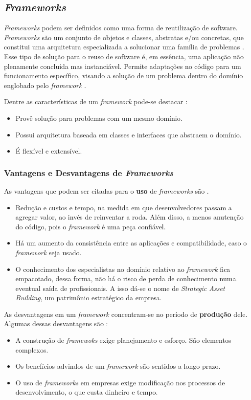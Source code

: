 \subsection{\textit{Frameworks}}
\textit{Frameworks} podem ser definidos como uma forma de reutilização de software. \textit{Frameworks} são um conjunto de objetos e classes, abstratas e/ou concretas, que constitui uma arquitetura especializada a solucionar uma família de problemas \cite{barretoJunior2006}. Esse tipo de solução para o reuso de software é, em essência, uma aplicação não plenamente concluída mas instanciável. Permite adaptações no código para um funcionamento específico, visando a solução de um problema dentro do domínio englobado pelo \textit{framework} \cite{barretoJunior2006}.
\par
\indent Dentre as características de um \textit{framework} pode-se destacar \cite{sauve2006}:
\begin{itemize}
\item Provê solução para problemas com um mesmo domínio.
\item Possui arquitetura baseada em classes e interfaces que abstraem o domínio.
\item É flexível e extensível.
\end{itemize}
\par
\subsubsection{Vantagens e Desvantagens de \textit{Frameworks}}
As vantagens que podem ser citadas para o \textbf{uso} de \textit{frameworks} são \cite{barretoJunior2006} \cite{sauve2006}.
\begin{itemize}
\item Redução e custos e tempo, na medida em que desenvolvedores passam a agregar valor, ao invés de reinventar a roda. Além disso, a menos anutenção do código, pois o \textit{framework} é uma peça confiável.
\item Há um aumento da consistência entre as aplicações e compatibilidade, caso o \textit{framework} seja usado.
\item O conhecimento dos especialistas no domínio relativo ao \textit{framework} fica empacotado, dessa forma, não há o risco de perda de conhecimento numa eventual saída de profissionais. A isso dá-se o nome de \textit{Strategic Asset Building}, um patrimônio estratégico da empresa.
\end{itemize}

As desvantagens em um \textit{framework} concentram-se no período de \textbf{produção} dele. Algumas dessas desvantagens são \cite{barretoJunior2006} \cite{sauve2006}:
\begin{itemize}
\item A construção de \textit{framewoks} exige planejamento e esforço. São elementos complexos.
\item Os benefícios advindos de um \textit{framework} são sentidos a longo prazo.
\item O uso de \textit{frameworks} em empresas exige modificação nos processos de desenvolvimento, o que custa dinheiro e tempo.
\end{itemize}
\par

